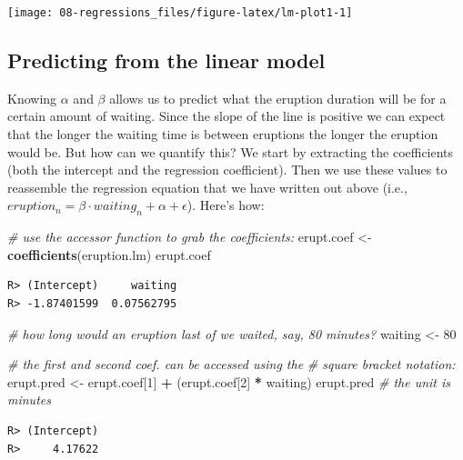 \documentclass[english,10pt,a4paper,oneside]{book}
\newenvironment{Shaded}{\begin{snugshade}}{\end{snugshade}}
\newcommand{\KeywordTok}[1]{\textcolor[rgb]{0.13,0.29,0.53}{\textbf{#1}}}
\newcommand{\DecValTok}[1]{\textcolor[rgb]{0.00,0.00,0.81}{#1}}
\newcommand{\StringTok}[1]{\textcolor[rgb]{0.31,0.60,0.02}{#1}}
\newcommand{\CommentTok}[1]{\textcolor[rgb]{0.56,0.35,0.01}{\textit{#1}}}
\newcommand{\OperatorTok}[1]{\textcolor[rgb]{0.81,0.36,0.00}{\textbf{#1}}}
\newcommand{\NormalTok}[1]{#1}
\theoremstyle{definition}
\theoremstyle{definition}
\theoremstyle{definition}
\theoremstyle{remark}
\begin{document}
\texttt{[image: 08-regressions\_files/figure-latex/lm-plot1-1]}

\subsection{Predicting from the linear
model}\label{predicting-from-the-linear-model}

Knowing \(\alpha\) and \(\beta\) allows us to predict what the eruption
duration will be for a certain amount of waiting. Since the slope of the
line is positive we can expect that the longer the waiting time is
between eruptions the longer the eruption would be. But how can we
quantify this? We start by extracting the coefficients (both the
intercept and the regression coefficient). Then we use these values to
reassemble the regression equation that we have written out above (i.e.,
\(eruption_{n}=\beta \cdot waiting_{n}+\alpha+\epsilon\)). Here's how:

\begin{Shaded}
\begin{Highlighting}[]
\CommentTok{# use the accessor function to grab the coefficients:}
\NormalTok{erupt.coef <-}\StringTok{ }\KeywordTok{coefficients}\NormalTok{(eruption.lm)}
\NormalTok{erupt.coef}
\end{Highlighting}
\end{Shaded}

\begin{verbatim}
R> (Intercept)     waiting 
R> -1.87401599  0.07562795
\end{verbatim}

\begin{Shaded}
\begin{Highlighting}[]
\CommentTok{# how long would an eruption last of we waited, say, 80 minutes?}
\NormalTok{waiting <-}\StringTok{ }\DecValTok{80} 
 
\CommentTok{# the first and second coef. can be accessed using the }
\CommentTok{# square bracket notation:}
\NormalTok{erupt.pred <-}\StringTok{ }\NormalTok{erupt.coef[}\DecValTok{1}\NormalTok{] }\OperatorTok{+}\StringTok{ }\NormalTok{(erupt.coef[}\DecValTok{2}\NormalTok{] }\OperatorTok{*}\StringTok{ }\NormalTok{waiting)}
\NormalTok{erupt.pred }\CommentTok{# the unit is minutes}
\end{Highlighting}
\end{Shaded}

\begin{verbatim}
R> (Intercept) 
R>     4.17622
\end{verbatim}
\end{document}
